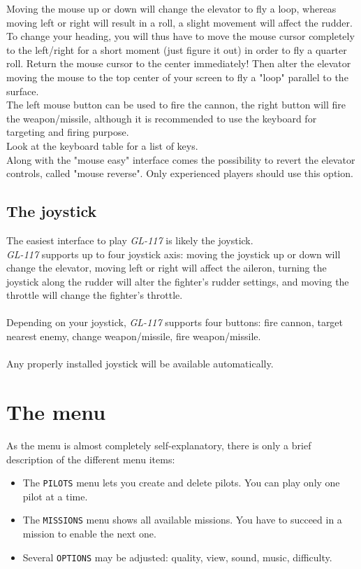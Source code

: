 Moving the mouse up or down will change the elevator to fly a loop, whereas
moving left or right will result in a roll, a slight movement will
affect the rudder.\\
To change your heading, you will thus have to move the mouse cursor completely
to the left/right for a short moment (just figure it out) in order to fly a
quarter roll. Return the mouse cursor to the center immediately!
Then alter the elevator moving the mouse to the top center of your screen to
fly a "loop" parallel to the surface.\\
The left mouse button can be used to fire the cannon, the right button will
fire the weapon/missile, although it is recommended to use the keyboard for
targeting and firing purpose.\\
Look at the keyboard table for a list of keys.\\
Along with the "mouse easy" interface comes the possibility to revert the
elevator controls, called "mouse reverse". Only experienced players should
use this option.

\subsection{The joystick}
\label{subsec:joystick}

The easiest interface to play \emph{GL-117} is likely the joystick.\\
\emph{GL-117} supports up to four joystick axis:
moving the joystick up or down will change the elevator, moving left or right
will affect the aileron, turning the joystick along the rudder will alter
the fighter's rudder settings, and moving the throttle will change
the fighter's throttle.\\\\
Depending on your joystick, \emph{GL-117} supports four buttons:
fire cannon, target nearest enemy, change weapon/missile, fire weapon/missile.\\\\
Any properly installed joystick will be available automatically.


\section{The menu}
\label{sec:menu}

As the menu is almost completely self-explanatory, there is only a brief
description of the different menu items:
\begin{itemize}
\item{The \texttt{PILOTS} menu lets you create and delete pilots. You can
play only one pilot at a time.}
\item{The \texttt{MISSIONS} menu shows all available missions. You have to
succeed in a mission to enable the next one.}
\item{Several \texttt{OPTIONS} may be adjusted: quality, view, sound, music,
difficulty.}
\end{itemize}



